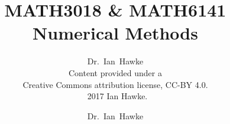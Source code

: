 \documentclass[a4paper,12pt]{report}
\begin{document}

\title{MATH3018 \& MATH6141 \\ Numerical Methods }
\author{Dr.~Ian~Hawke\\ Content provided under a \\Creative Commons attribution license, CC-BY 4.0. \\ \textcopyright\ 2017 Ian Hawke.}
\author{Dr.~Ian~Hawke}
\date{}

\maketitle


\begin{titlepage}
\newpage
\mbox{}
\end{titlepage}

\tableofcontents






%








\appendix

\end{document}
